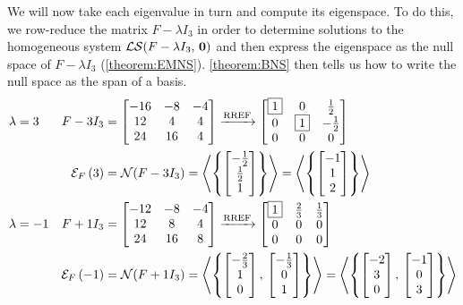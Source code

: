 \documentclass{ximera}
\begin{document}
\begin{example}
  We will now take each eigenvalue in turn and compute its eigenspace.
  To do this, we row-reduce the matrix $F-\lambda I_3$ in order to
  determine solutions to the homogeneous system
  $\mathcal{LS}\!\left(F-\lambda I_3,\,\mathbf{0}\right)$ and then express the eigenspace as the
  null space of $F-\lambda I_3$ (\ref{theorem:EMNS}).
  \ref{theorem:BNS} then tells us how to write the null space as the
  span of a basis.
  \begin{align*}
    \lambda&=3&F-3I_3&=
                       \begin{bmatrix}
                         -16 & -8 & -4\\
                         12 & 4 & 4\\
                         24 & 16 & 4
                       \end{bmatrix}
                                   \xrightarrow{\text{RREF}}
                                   \begin{bmatrix}
                                     \fbox{1} & 0 & \frac{1}{2}\\
                                     0 & \fbox{1} & -\frac{1}{2}\\
                                     0 & 0 & 0
                                   \end{bmatrix}\\
           &&\mathcal{E}_{F}\left(3\right)&=\mathcal{N}\!\left(F-3I_3\right)
                                =\left\langle\left\{\begin{bmatrix}-\frac{1}{2}\\\frac{1}{2}\\1\end{bmatrix}\right\}\right\rangle
    =\left\langle\left\{\begin{bmatrix}-1\\1\\2\end{bmatrix}\right\}\right\rangle\\
    \lambda&=-1&F+1I_3&=
                        \begin{bmatrix}
                          -12 & -8 & -4\\
                          12 & 8 & 4\\
                          24 & 16 & 8
                        \end{bmatrix}
                                    \xrightarrow{\text{RREF}}
                                    \begin{bmatrix}
                                      \fbox{1} & \frac{2}{3} & \frac{1}{3}\\
                                      0 & 0 & 0\\
                                      0 & 0 & 0
                                    \end{bmatrix}\\
           &&\mathcal{E}_{F}\left(-1\right)&=\mathcal{N}\!\left(F+1I_3\right)
                                 =\left\langle\left\{\begin{bmatrix}-\frac{2}{3}\\1\\0\end{bmatrix},\,\begin{bmatrix}-\frac{1}{3}\\0\\1\end{bmatrix}\right\}\right\rangle
    =\left\langle\left\{\begin{bmatrix}-2\\3\\0\end{bmatrix},\,\begin{bmatrix}-1\\0\\3\end{bmatrix}\right\}\right\rangle
  \end{align*}
  

\end{example}
\end{document}
